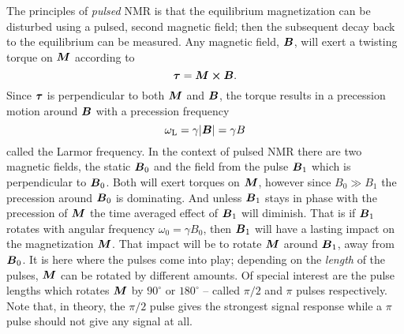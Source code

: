 \documentclass[11pt,a4paper, twocolumn,
swedish, english %
]{article}
\begin{document}
The principles of \emph{pulsed} NMR is that the equilibrium
magnetization can be disturbed using a pulsed, second magnetic field;
then the subsequent decay back to the equilibrium can be
measured. Any magnetic field, $\vb*B$, will exert a twisting torque on
$\vb*M$ according to
\begin{equation}
\vb*\tau=\vb*M\cross\vb*B.
\end{equation}
Since $\vb*\tau$ is perpendicular to both $\vb*M$ and $\vb*B$, the
torque results in a precession motion around $\vb*B$ with a
precession frequency \cite[ch. 2.1]{Principles_MR1990}
\begin{equation}
\omega_\text{L} = \gamma \abs{\vb*B}= \gamma B
\end{equation}
called the Larmor frequency. 
In the context of pulsed NMR there are two magnetic fields, the static
$\vb*B_0$ and the field from the pulse $\vb*B_1$ which is
perpendicular to $\vb*B_0$. Both will exert torques on $\vb*M$,
however since $B_0\gg B_1$ the precession around $\vb*B_0$ is
dominating. And unless $\vb*B_1$ stays in phase with the precession of
$\vb*M$ the time averaged effect of $\vb*B_1$ will diminish. That is
if $\vb*B_1$ rotates\footnotemark{} with angular frequency
$\omega_0=\gamma B_0$, then $\vb*B_1$ will have a lasting impact on
the magnetization $\vb*M$. That impact will be to rotate $\vb*M$
around $\vb*B_1$, away from $\vb*B_0$. It is here where the pulses
come into play; depending on the \emph{length} of the pulses, $\vb*M$
can be rotated by different amounts. Of special interest are the pulse
lengths which rotates $\vb*M$ by $90^\circ$ or $180^\circ$ -- called
$\pi/2$ and $\pi$ pulses respectively. Note that, in theory, the
$\pi/2$ pulse gives the strongest signal response while a $\pi$ pulse
should not give any signal at all.

\end{document}
